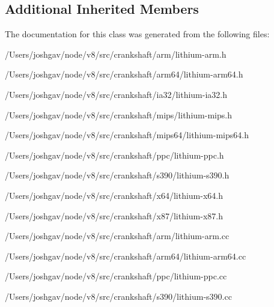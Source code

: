 \subsection*{Additional Inherited Members}


The documentation for this class was generated from the following files\+:\begin{DoxyCompactItemize}
\item 
/\+Users/joshgav/node/v8/src/crankshaft/arm/lithium-\/arm.\+h\item 
/\+Users/joshgav/node/v8/src/crankshaft/arm64/lithium-\/arm64.\+h\item 
/\+Users/joshgav/node/v8/src/crankshaft/ia32/lithium-\/ia32.\+h\item 
/\+Users/joshgav/node/v8/src/crankshaft/mips/lithium-\/mips.\+h\item 
/\+Users/joshgav/node/v8/src/crankshaft/mips64/lithium-\/mips64.\+h\item 
/\+Users/joshgav/node/v8/src/crankshaft/ppc/lithium-\/ppc.\+h\item 
/\+Users/joshgav/node/v8/src/crankshaft/s390/lithium-\/s390.\+h\item 
/\+Users/joshgav/node/v8/src/crankshaft/x64/lithium-\/x64.\+h\item 
/\+Users/joshgav/node/v8/src/crankshaft/x87/lithium-\/x87.\+h\item 
/\+Users/joshgav/node/v8/src/crankshaft/arm/lithium-\/arm.\+cc\item 
/\+Users/joshgav/node/v8/src/crankshaft/arm64/lithium-\/arm64.\+cc\item 
/\+Users/joshgav/node/v8/src/crankshaft/ppc/lithium-\/ppc.\+cc\item 
/\+Users/joshgav/node/v8/src/crankshaft/s390/lithium-\/s390.\+cc\end{DoxyCompactItemize}
